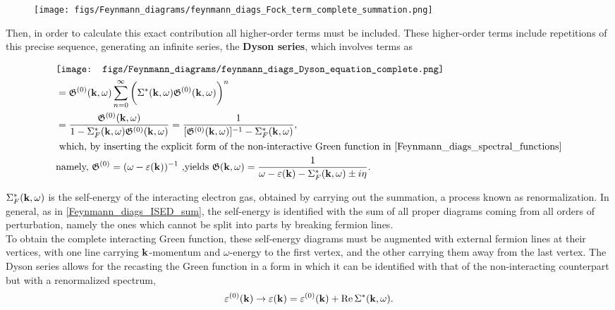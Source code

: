 \begin{figure}
\texttt{[image: figs/Feynmann\_diagrams/feynmann\_diags\_Fock\_term\_complete\_summation.png]}
\end{figure} 

Then, in order to calculate this exact contribution all higher-order terms must be included. These higher-order terms include repetitions of this precise sequence, generating an infinite series, the \textbf{Dyson series}, which involves terms as 

\begin{equation}
    \begin{split}
        & \texttt{[image: figs/Feynmann\_diagrams/feynmann\_diags\_Dyson\_equation\_complete.png]} \\
        &= \mathfrak{G}^{(0)}({\bf k}, \omega) \sum_{n=0}^{\infty} \bigg(\Sigma^{*}({\bf k}, \omega)\mathfrak{G}^{(0)}({\bf k}, \omega)\bigg)^n \\
        &= \frac{\mathfrak{G}^{(0)}({\bf k}, \omega)}{1-\Sigma^{*}_F({\bf k}, \omega) \mathfrak{G}^{(0)}({\bf k}, \omega)} = \frac{1}{[\mathfrak{G}^{(0)}({\bf k}, \omega)]^{-1} - \Sigma^{*}_F({\bf k}, \omega)}, \\
        & \textnormal{ which, by inserting the explicit form of the non-interactive Green function in \cref{Feynmann_diags_spectral_functions}} \\
        & \textnormal{namely, $\mathfrak{G}^{(0)} = (\omega - \varepsilon({\bf k}))^{-1}$ ,yields }
        \mathfrak{G}({\bf k}, \omega) = \frac{1}{\omega - \varepsilon({\bf k}) - \Sigma_F^{*}({\bf k}, \omega) \pm i\eta}.
    \end{split}
\end{equation}

$\Sigma_F^{*}({\bf k}, \omega)$ is the self-energy of the interacting electron gas, obtained by carrying out the summation, a process known as renormalization. In general, as in \cref{Feynmann_diags_ISED_sum}, the self-energy is identified with the sum of all proper diagrams coming from all orders of perturbation, namely the ones which cannot be split into parts by breaking fermion lines. \\

To obtain the complete interacting Green function, these self-energy diagrams must be augmented with external fermion lines at their vertices, with one line carrying ${\bf k}$-momentum and $\omega$-energy to the first vertex, and the other carrying them away from the last vertex. The Dyson series allows for the recasting the Green function in a form in which it can be identified with that of the non-interacting counterpart but with a renormalized spectrum, 
$$
    \varepsilon^{(0)}({\bf k}) \rightarrow \varepsilon({\bf k}) = \varepsilon^{(0)}({\bf k}) + \Re \Sigma^{*}({\bf k}, \omega).
$$

